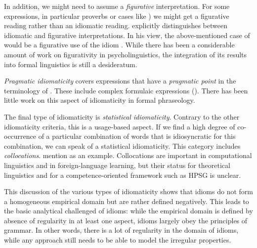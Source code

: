 \documentclass[output=paper]{langsci/langscibook}
\begin{document}
In addition, we might need to assume a \emph{figurative} interpretation. For some expressions, in particular proverbs or cases like 
) we might get a figurative reading rather than an idiomatic reading. 
%
\cite{Glucksberg:01} explicitly distinguishes between idiomatic and figurative interpretations. In his view, the above-mentioned case of  would be a figurative use of the idiom . 
While there has been a considerable amount of work on figurativity in psycholinguistics, the integration of its results into formal linguistics is still a desideratum.%

\emph{Pragmatic idiomaticity} covers expressions that have a \emph{pragmatic point} in the terminology of \cite{FKoC88a}. These include complex formulaic expressions (). There has been little work on this aspect of idiomaticity in formal phraseology.

The final type of idiomaticity is \emph{statistical idiomaticity}. 
Contrary to the other idiomaticity criteria, this is a usage-based aspect. If we find a high degree of co-occurrence of a particular combination of words that is idiosyncratic for this combination, we can speak of a statistical idiomaticity. This category includes \emph{collocations}. \cite{Baldwin:Kim:10} mention  as an example. Collocations are important in computational linguistics and in foreign-language learning, but their status for theoretical linguistics and for a competence-oriented framework such as HPSG is unclear. 

This discussion of the various types of idiomaticity shows that idioms do not form a homogeneous empirical domain but are rather defined negatively. 
This leads to the basic analytical challenged of idioms: while the empirical domain is defined by  absence of regularity in at least one aspect, idioms largely obey the principles of grammar. 
In other words, there is a lot of regularity in the domain of idioms, while any approach still needs to be able to model the irregular properties. 



\end{document}
